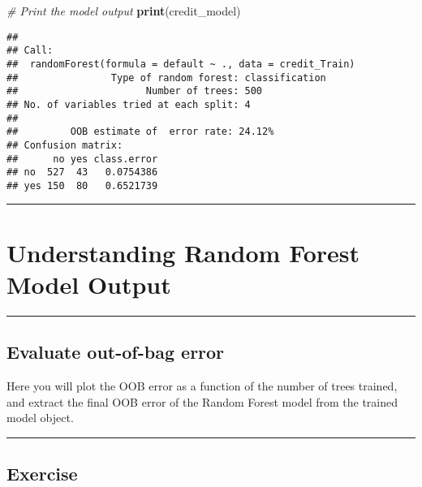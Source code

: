 \documentclass[
]{book}
\newenvironment{Shaded}{\begin{snugshade}}{\end{snugshade}}
\newcommand{\CommentTok}[1]{\textcolor[rgb]{0.56,0.35,0.01}{\textit{#1}}}
\newcommand{\KeywordTok}[1]{\textcolor[rgb]{0.13,0.29,0.53}{\textbf{#1}}}
\newcommand{\NormalTok}[1]{#1}
\begin{document}
\begin{Shaded}
\begin{Highlighting}[]
\CommentTok{# Print the model output                             }
\KeywordTok{print}\NormalTok{(credit_model)}
\end{Highlighting}
\end{Shaded}

\begin{verbatim}
## 
## Call:
##  randomForest(formula = default ~ ., data = credit_Train) 
##                Type of random forest: classification
##                      Number of trees: 500
## No. of variables tried at each split: 4
## 
##         OOB estimate of  error rate: 24.12%
## Confusion matrix:
##      no yes class.error
## no  527  43   0.0754386
## yes 150  80   0.6521739
\end{verbatim}

\begin{center}\rule{0.5\linewidth}{0.5pt}\end{center}

\hypertarget{understanding-random-forest-model-output}{%
\section{Understanding Random Forest Model Output}\label{understanding-random-forest-model-output}}

\begin{center}\rule{0.5\linewidth}{0.5pt}\end{center}

\hypertarget{evaluate-out-of-bag-error}{%
\subsection{Evaluate out-of-bag error}\label{evaluate-out-of-bag-error}}

Here you will plot the OOB error as a function of the number of trees trained, and extract the final OOB error of the Random Forest model from the trained model object.

\begin{center}\rule{0.5\linewidth}{0.5pt}\end{center}

\hypertarget{exercise-17}{%
\subsection*{Exercise}\label{exercise-17}}
\end{document}
